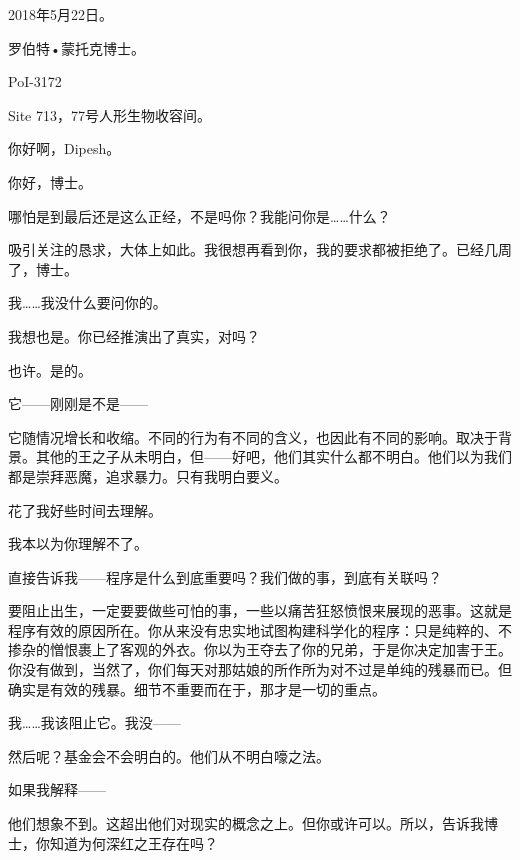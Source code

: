 \begin{scpbox}

2018年5月22日。

罗伯特•蒙托克博士。

PoI-3172

Site 713，77号人形生物收容间。



你好啊，Dipesh。

你好，博士。

哪怕是到最后还是这么正经，不是吗你？我能问你是……什么？

吸引关注的恳求，大体上如此。我很想再看到你，我的要求都被拒绝了。已经几周了，博士。

我……我没什么要问你的。

我想也是。你已经推演出了真实，对吗？

也许。是的。


它——刚刚是不是——

它随情况增长和收缩。不同的行为有不同的含义，也因此有不同的影响。取决于背景。其他的王之子从未明白，但——好吧，他们其实什么都不明白。他们以为我们都是崇拜恶魔，追求暴力。只有我明白要义。

花了我好些时间去理解。

我本以为你理解不了。

直接告诉我——程序是什么到底重要吗？我们做的事，到底有关联吗？

要阻止出生，一定要要做些可怕的事，一些以痛苦狂怒愤恨来展现的恶事。这就是程序有效的原因所在。你从来没有忠实地试图构建科学化的程序：只是纯粹的、不掺杂的憎恨裹上了客观的外衣。你以为王夺去了你的兄弟，于是你决定加害于王。你没有做到，当然了，你们每天对那姑娘的所作所为对不过是单纯的残暴而已。但确实是有效的残暴。细节不重要而在于，那才是一切的重点。

我……我该阻止它。我没——

然后呢？基金会不会明白的。他们从不明白嚎之法。

如果我解释——

他们想象不到。这超出他们对现实的概念之上。但你或许可以。所以，告诉我博士，你知道为何深红之王存在吗？


\end{scpbox}
